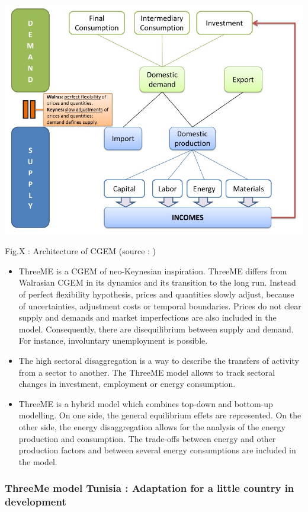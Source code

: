 \documentclass[
]{article}
\begin{document}
\includegraphics{Images/Architecture of a CGEM.jpg}

Fig.X : Architecture of CGEM (source : \textcite{callonnec2013})

\begin{itemize}
\item
  ThreeME is a CGEM of neo-Keynesian inspiration. ThreeME differs from
  Walrasian CGEM in its dynamics and its transition to the long run.
  Instead of perfect flexibility hypothesis, prices and quantities
  slowly adjust, because of uncertainties, adjustment costs or temporal
  boundaries. Prices do not clear supply and demands and market
  imperfections are also included in the model. Consequently, there are
  disequilibrium between supply and demand. For instance, involuntary
  unemployment is possible.
\item
  The high sectoral disaggregation is a way to describe the transfers of
  activity from a sector to another. The ThreeME model allows to track
  sectoral changes in investment, employment or energy consumption.
\item
  ThreeME is a hybrid model which combines top-down and bottom-up
  modelling. On one side, the general equilibrium effets are
  represented. On the other side, the energy disaggregation allows for
  the analysis of the energy production and consumption. The trade-offs
  between energy and other production factors and between several energy
  consumptions are included in the model.
\end{itemize}

\hypertarget{threeme-model-tunisia-adaptation-for-a-little-country-in-development}{%
\subsubsection{ThreeMe model Tunisia : Adaptation for a little country
in
development}\label{threeme-model-tunisia-adaptation-for-a-little-country-in-development}}
\end{document}
